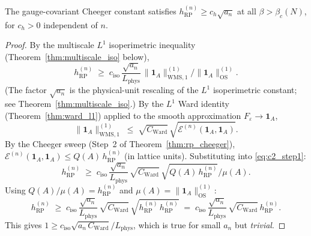 \begin{theorem}
\label{thm:C2_correct}
The gauge-covariant Cheeger constant satisfies
$h_{\mathrm{RP}}^{(n)}\ge c_{h}\sqrt{a_{n}}$ at all
$\beta>\beta_{c}(N)$, for $c_{h}>0$ independent of $n$.
\end{theorem}

\begin{proof}
By the multiscale $L^{1}$ isoperimetric inequality
(Theorem~\ref{thm:multiscale_iso} below),
\begin{equation}
\label{eq:c2_step1}
  h_{\mathrm{RP}}^{(n)}
  \;\ge\;c_{\mathrm{iso}}\,
  \frac{\sqrt{a_{n}}}{L_{\mathrm{phys}}}\,
  \|\mathbf{1}_{A}\|_{\mathrm{WMS},1}^{(1)}/
  \|\mathbf{1}_{A}\|_{\mathrm{OS}}^{(1)}.
\end{equation}
(The factor $\sqrt{a_{n}}$ is the physical-unit rescaling of the
$L^{1}$ isoperimetric constant; see
Theorem~\ref{thm:multiscale_iso}.) By the $L^{1}$ Ward identity
(Theorem~\ref{thm:ward_l1}) applied to the smooth approximation
$F_{\varepsilon}\to\mathbf{1}_{A}$,
\[
  \|\mathbf{1}_{A}\|_{\mathrm{WMS},1}^{(1)}
  \;\le\;\sqrt{C_{\mathrm{Ward}}}\,
  \sqrt{\mathcal{E}^{(n)}(\mathbf{1}_{A},\mathbf{1}_{A})}.
\]
By the Cheeger sweep (Step~2 of Theorem~\ref{thm:rp_cheeger}),
$\mathcal{E}^{(n)}(\mathbf{1}_{A},\mathbf{1}_{A})\le
Q(A)\,h_{\mathrm{RP}}^{(n)}$ (in lattice units). Substituting into
\eqref{eq:c2_step1}:
\[
  h_{\mathrm{RP}}^{(n)}
  \;\ge\;c_{\mathrm{iso}}\,\frac{\sqrt{a_{n}}}{L_{\mathrm{phys}}}\,
  \sqrt{C_{\mathrm{Ward}}}\,
  \sqrt{Q(A)\,h_{\mathrm{RP}}^{(n)}}/\mu(A).
\]
Using $Q(A)/\mu(A)=h_{\mathrm{RP}}^{(n)}$ and
$\mu(A)=\|\mathbf{1}_{A}\|_{\mathrm{OS}}^{(1)}$:
\[
  h_{\mathrm{RP}}^{(n)}
  \;\ge\;c_{\mathrm{iso}}\,\frac{\sqrt{a_{n}}}{L_{\mathrm{phys}}}\,
  \sqrt{C_{\mathrm{Ward}}}\,
  \sqrt{h_{\mathrm{RP}}^{(n)}\,h_{\mathrm{RP}}^{(n)}}
  \;=\;c_{\mathrm{iso}}\,\frac{\sqrt{a_{n}}}{L_{\mathrm{phys}}}\,
  \sqrt{C_{\mathrm{Ward}}}\,
  h_{\mathrm{RP}}^{(n)}.
\]
This gives $1\ge c_{\mathrm{iso}}\sqrt{a_{n}\,C_{\mathrm{Ward}}}/
L_{\mathrm{phys}}$, which is true for small $a_{n}$ but
\emph{trivial}.

\medskip


\end{proof}

